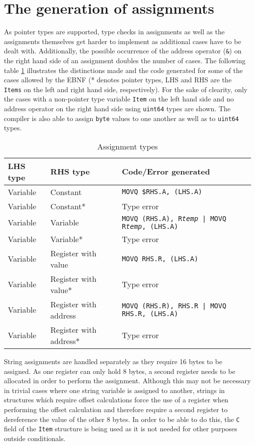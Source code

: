 \documentclass[a4paper]{scrreprt}
\begin{document}
    \section{The generation of assignments}
      As pointer types are supported, type checks in assignments as well as the assignments themselves get harder to implement as additional cases have to be dealt with. Additionally, the possible occurrence of the address operator (\texttt{\&}) on the right hand side of an assignment doubles the number of cases. The following table \ref{tbl:assigntypes} illustrates the distinctions made and the code generated for some of the cases allowed by the EBNF (* denotes pointer types, LHS and RHS are the \texttt{Items} on the left and right hand side, respectively). For the sake of clearity, only the cases with a non-pointer type variable \texttt{Item} on the left hand side and no address operator on the right hand side using \texttt{uint64} types are shown. The compiler is also able to assign \texttt{byte} values to one another as well as to \texttt{uint64} types.

      \begin{table}[htb]
      \begin{tabular}{lll}
        \toprule
        \textbf{LHS type} & \textbf{RHS type} & \textbf{Code/Error generated}\\
        \midrule
        Variable & Constant & \texttt{MOVQ \$RHS.A, (LHS.A)}\\
        Variable & Constant* & Type error\\
        Variable & Variable & \texttt{MOVQ (RHS.A), R\textit{temp} | MOVQ R\textit{temp}, (LHS.A)}\\
        Variable & Variable* & Type error\\
        Variable & Register with value & \texttt{MOVQ RHS.R, (LHS.A)}\\
        Variable & Register with value* & Type error\\
        Variable & Register with address & \texttt{MOVQ (RHS.R), RHS.R | MOVQ RHS.R, (LHS.A)}\\
        Variable & Register with address* & Type error\\
        \bottomrule
      \end{tabular}
      \caption{Assignment types}
      \label{tbl:assigntypes}
      \end{table}
      
      String assignments are handled separately as they require 16 bytes to be assigned. As one register can only hold 8 bytes, a second register needs to be allocated in order to perform the assignment. Although this may not be necessary in trivial cases where one string variable is assigned to another, strings in structures which require offset calculations force the use of a register when performing the offset calculation and therefore require a second register to dereference the value of the other 8 bytes. In order to be able to do this, the \texttt{C} field of the \texttt{Item} structure is being used as it is not needed for other purposes outside conditionals.
\end{document}
